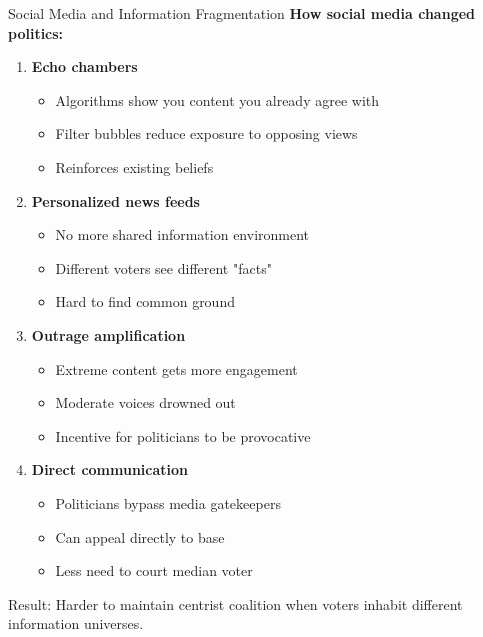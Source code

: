 \documentclass[10pt]{beamer}
\begin{document}
\begin{frame}[allowframebreaks]{Social Media and Information Fragmentation}
\textbf{How social media changed politics:}


\begin{enumerate}
\item \textbf{Echo chambers}
\begin{itemize}
\item Algorithms show you content you already agree with
\item Filter bubbles reduce exposure to opposing views
\item Reinforces existing beliefs
\end{itemize}


\item \textbf{Personalized news feeds}
\begin{itemize}
\item No more shared information environment
\item Different voters see different "facts"
\item Hard to find common ground
\end{itemize}

\framebreak

\item \textbf{Outrage amplification}
\begin{itemize}
\item Extreme content gets more engagement
\item Moderate voices drowned out
\item Incentive for politicians to be provocative
\end{itemize}


\item \textbf{Direct communication}
\begin{itemize}
\item Politicians bypass media gatekeepers
\item Can appeal directly to base
\item Less need to court median voter
\end{itemize}
\end{enumerate}



\alert{Result:} Harder to maintain centrist coalition when voters inhabit different information universes.
\end{frame}
\end{document}
